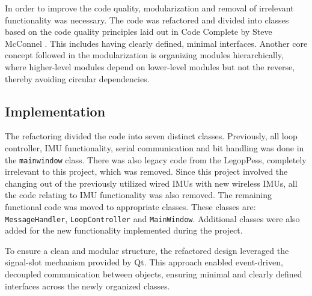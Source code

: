 In order to improve the code quality, modularization and removal of irrelevant functionality was necessary. The code was refactored and divided into classes based on the code quality principles laid out in Code Complete by Steve McConnel \cite{steve_mcconnell_code_nodate}. This includes having clearly defined, minimal interfaces. Another core concept followed in the modularization is organizing modules hierarchically, where higher-level modules depend on lower-level modules but not the reverse, thereby avoiding circular dependencies. 

\subsection{Implementation}
The refactoring divided the code into seven distinct classes. Previously, all loop controller, IMU functionality, serial communication and bit handling was done in the \texttt{mainwindow} class. There was also legacy code from the LegopPess, completely irrelevant to this project, which was removed. Since this project involved the changing out of the previously utilized wired IMUs with new wireless IMUs, all the code relating to IMU functionality was also removed. The remaining functional code was moved to appropriate classes. These classes are: \texttt{MessageHandler}, \texttt{LoopController} and \texttt{MainWindow}. Additional classes were also added for the new functionality implemented during the project.

To ensure a clean and modular structure, the refactored design leveraged the signal-slot mechanism provided by Qt. This approach enabled event-driven, decoupled communication between objects, ensuring minimal and clearly defined interfaces across the newly organized classes.

